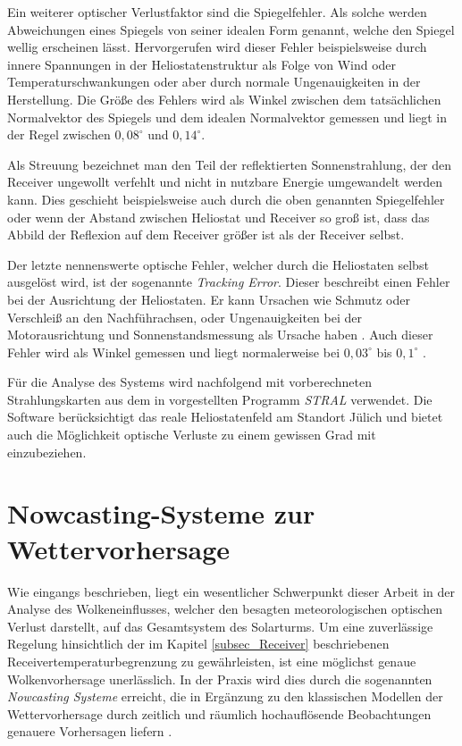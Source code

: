 Ein weiterer optischer Verlustfaktor sind die Spiegelfehler.
Als solche werden Abweichungen eines Spiegels von seiner idealen Form genannt, welche den Spiegel wellig erscheinen lässt.
Hervorgerufen wird dieser Fehler beispielsweise durch innere Spannungen in der Heliostatenstruktur als Folge von Wind oder Temperaturschwankungen oder aber durch normale Ungenauigkeiten in der Herstellung.
Die Größe des Fehlers wird als Winkel zwischen dem tatsächlichen Normalvektor des Spiegels und dem idealen Normalvektor gemessen und liegt in der Regel zwischen $0,08^\circ$ und $0,14^\circ$. \cite[S. 16]{DissBelhomme}

Als Streuung bezeichnet man den Teil der reflektierten Sonnenstrahlung, der den Receiver ungewollt verfehlt und nicht in nutzbare Energie umgewandelt werden kann.
Dies geschieht beispielsweise auch durch die oben genannten Spiegelfehler oder wenn der Abstand zwischen Heliostat und Receiver so groß ist, dass das Abbild der Reflexion auf dem Receiver größer ist als der Receiver selbst. \cite[S. 15-16]{DissBelhomme}

Der letzte nennenswerte optische Fehler, welcher durch die Heliostaten selbst ausgelöst wird, ist der sogenannte \textit{Tracking Error}.
Dieser beschreibt einen Fehler bei der Ausrichtung der Heliostaten.
Er kann Ursachen wie Schmutz oder Verschleiß an den Nachführachsen, oder Ungenauigkeiten bei der Motorausrichtung und Sonnenstandsmessung als Ursache haben \cite[S. 7]{Richter}. Auch dieser Fehler wird als Winkel gemessen und liegt normalerweise bei $0,03^\circ$ bis $0,1^\circ$ \cite[S. 17]{DissBelhomme}.

Für die Analyse des Systems wird nachfolgend mit vorberechneten Strahlungskarten aus dem in \cite[S. 53ff]{DissBelhomme} vorgestellten Programm \textit{STRAL} verwendet.
Die Software berücksichtigt das reale Heliostatenfeld am Standort Jülich und bietet auch die Möglichkeit optische Verluste zu einem gewissen Grad mit einzubeziehen.


\section{Nowcasting-Systeme zur Wettervorhersage} \label{sec_Nowcasting}
Wie eingangs beschrieben, liegt ein wesentlicher Schwerpunkt dieser Arbeit in der Analyse des Wolkeneinflusses, welcher den besagten meteorologischen optischen Verlust darstellt, auf das Gesamtsystem des Solarturms.
Um eine zuverlässige Regelung hinsichtlich der im Kapitel \ref{subsec_Receiver} beschriebenen Receivertemperaturbegrenzung zu gewährleisten, ist eine möglichst genaue Wolkenvorhersage unerlässlich.
In der Praxis wird dies durch die sogenannten \textit{Nowcasting Systeme} erreicht, die in Ergänzung zu den klassischen Modellen der Wettervorhersage durch zeitlich und räumlich hochauflösende Beobachtungen genauere Vorhersagen liefern \cite{DWD1}.

